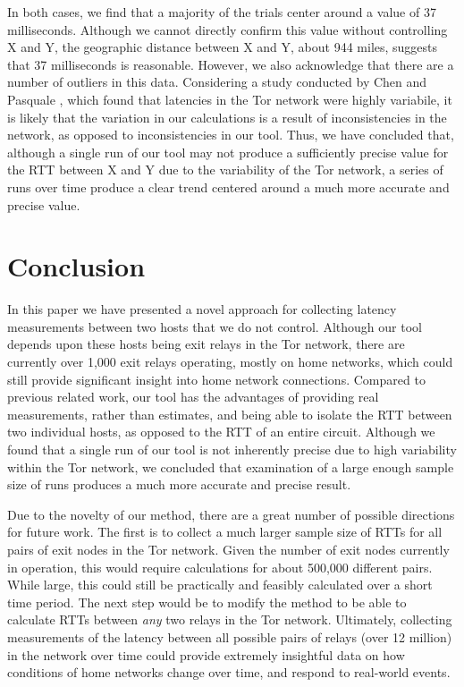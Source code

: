 \documentclass[twocolumn,11pt]{article}
\begin{document}
In both cases, we find that a majority of the trials center around a value of 37 milliseconds. Although we cannot directly confirm this value without controlling X and Y, the geographic distance between X and Y, about 944 miles, suggests that 37 milliseconds is reasonable. However, we also acknowledge that there are a number of outliers in this data. Considering a study conducted by Chen and Pasquale \cite{improving_path}, which found that latencies in the Tor network were highly variabile, it is likely that the variation in our calculations is a result of inconsistencies in the network, as opposed to inconsistencies in our tool. Thus, we have concluded that, although a single run of our tool may not produce a sufficiently precise value for the RTT between X and Y due to the variability of the Tor network, a series of runs over time produce a clear trend centered around a much more accurate and precise value. 

\section{Conclusion}

In this paper we have presented a novel approach for collecting latency measurements between two hosts that we do not control. Although our tool depends upon these hosts being exit relays in the Tor network, there are currently over 1,000 exit relays operating, mostly on home networks, which could still provide significant insight into home network connections. Compared to previous related work, our tool has the advantages of providing real measurements, rather than estimates, and being able to isolate the RTT between two individual hosts, as opposed to the RTT of an entire circuit. Although we found that a single run of our tool is not inherently precise due to high variability within the Tor network, we concluded that examination of a large enough sample size of runs produces a much more accurate and precise result. 

Due to the novelty of our method, there are a great number of possible directions for future work. The first is to collect a much larger sample size of RTTs for all pairs of exit nodes in the Tor network. Given the number of exit nodes currently in operation, this would require calculations for about 500,000 different pairs. While large, this could still be practically and feasibly calculated over a short time period. The next step would be to modify the method to be able to calculate RTTs between \textit{any} two relays in the Tor network. Ultimately, collecting measurements of the latency between all possible pairs of relays (over 12 million) in the network over time could provide extremely insightful data on how conditions of home networks change over time, and respond to real-world events.
 


\end{document}
